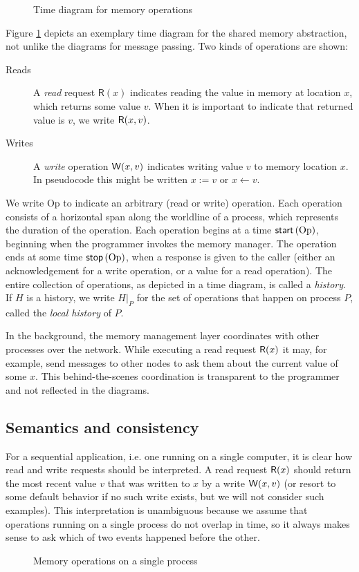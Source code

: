 \documentclass[]             %
{NASA}                       %
\theoremstyle{definition}
\begin{document}
\begin{figure}
    \centering
    
    \caption{Time diagram for memory operations}
    \label{fig:smEx1}
\end{figure}

\newcommand{\Op}{\mathrm{Op}}

Figure \ref{fig:smEx1} depicts an exemplary time diagram for the
shared memory abstraction, not unlike the diagrams for message
passing. Two kinds of operations are shown:
\begin{description}
\item[Reads] A \emph{read} request $\mathsf{R}(x)$ indicates reading the value
  in memory at location $x$, which returns some value $v$. When it is
  important to indicate that returned value is $v$, we write $\mathsf{R}\!\left(x, v\right)$.
\item[Writes] A \emph{write} operation $\mathsf{W}\!\left(x, v\right)$ indicates writing
  value $v$ to memory location $x$. In pseudocode this might be written
  $x := v$ or $x \leftarrow v$.
\end{description}
We write $\Op$ to indicate an arbitrary (read or write)
operation. Each operation consists of a horizontal span along the
worldline of a process, which represents the duration of the
operation. Each operation begins at a time $\memstart{\Op}$, beginning
when the programmer invokes the memory manager. The operation ends at
some time $\memstop{\Op}$, when a response is given to the caller
(either an acknowledgement for a write operation, or a value for a
read operation). The entire collection of operations, as depicted in a
time diagram, is called a \emph{history}. If $H$ is a history, we
write $H|_P$ for the set of operations that happen on process $P$,
called the \emph{local history} of $P$.

In the background, the memory management layer coordinates with other
processes over the network. While executing a read request
$\mathsf{R}\!\left(x\right)$ it may, for example, send messages to other nodes to ask
them about the current value of some $x$. This behind-the-scenes
coordination is transparent to the programmer and not reflected in the
diagrams.

\subsection{Semantics and consistency}
For a sequential application, i.e. one running on a single computer,
it is clear how read and write requests should be interpreted. A read
request $\mathsf{R}\!\left(x\right)$ should return the most recent value $v$ that was
written to $x$ by a write $\mathsf{W}\!\left(x, v\right)$ (or resort to some default
behavior if no such write exists, but we will not consider such
examples). This interpretation is unambiguous because we assume that
operations running on a single process do not overlap in time, so it
always makes sense to ask which of two events happened before the
other.
\begin{figure}
  
  \caption{Memory operations on a single process}
  \label{fig:smEx0}
\end{figure}
\end{document}

